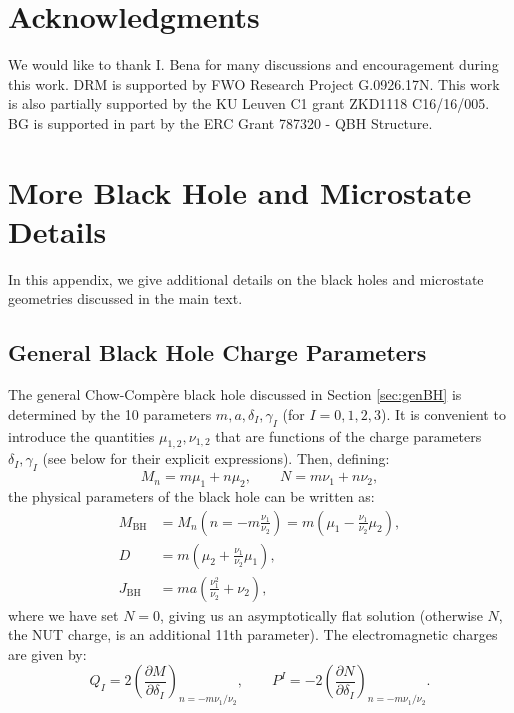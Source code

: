 \documentclass[12pt,a4paper]{article}
\newcommand{\be}{\begin{equation}}
\newcommand{\ee}{\end{equation}}
\begin{document}
\section*{Acknowledgments}
 We would like to thank I. Bena for many discussions and encouragement during this work.
 DRM is supported by FWO Research Project G.0926.17N. This work is also partially supported by the KU Leuven C1 grant ZKD1118 C16/16/005.
 BG is supported in part by the ERC Grant 787320 - QBH Structure.


\appendix

\section{More Black Hole and Microstate Details}
In this appendix, we give additional details on the black holes and microstate geometries discussed in the main text.


\subsection{General Black Hole Charge Parameters}\label{app:chargeparams}
The general Chow-Comp\`ere \cite{Chow:2014cca} black hole discussed in Section \ref{sec:genBH} is determined by the 10 parameters $m,a,\delta_I,\gamma_I$ (for $I=0,1,2,3$). It is convenient to introduce the quantities $\mu_{1,2},\nu_{1,2}$ that are functions of the charge parameters $\delta_I,\gamma_I$ (see below for their explicit expressions).
%
Then, defining:
\be M_n = m\mu_1 + n \mu_2, \qquad N = m\nu_1 + n \nu_2,\ee
the physical parameters of the black hole can be written as:
\be \begin{aligned}
 M_\text{BH} &= M_n\left(n=-m\frac{\nu_1}{\nu_2}\right) = m\left(\mu_1 -\frac{\nu_1}{\nu_2}\mu_2\right),\\
 D &= m\left( \mu_2 +\frac{\nu_1}{\nu_2}\mu_1\right),\\
 J_\text{BH} &= m a \left(\frac{\nu_1^2}{\nu_2}+\nu_2\right),\end{aligned} \ee
where we have set $N=0$, giving us an asymptotically flat solution (otherwise $N$, the NUT charge, is an additional 11th parameter). The electromagnetic charges are given by:
\be Q_I = 2 \left(\frac{\partial M}{\partial \delta_I}\right)_{n=-m\nu_1/\nu_2}, \qquad P^I = -2\left(\frac{\partial N}{\partial \delta_I}\right)_{n=-m\nu_1/\nu_2}.\ee
\end{document}
